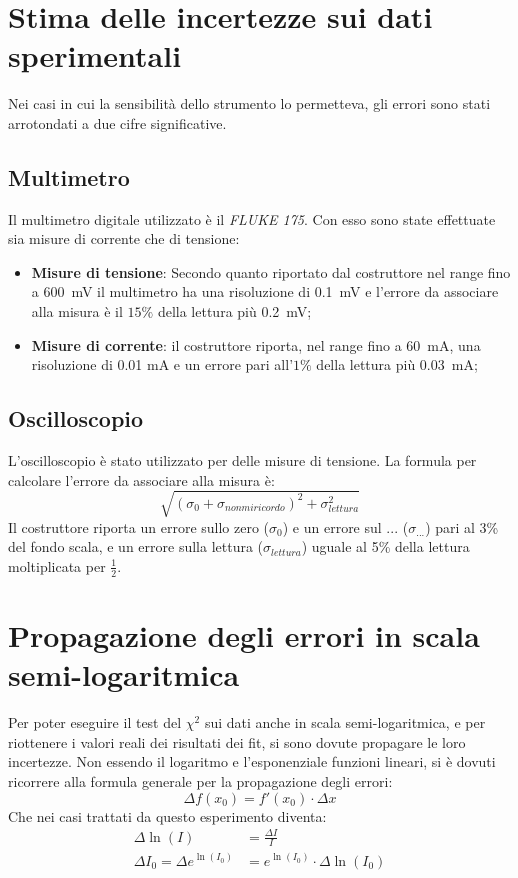 \documentclass[@SRC@/main]{subfiles}
\begin{document}
\section{Stima delle incertezze sui dati sperimentali}
  \label{sec:stima-delle-incertezze-sui-dati-sperimentali}
  Nei casi in cui la sensibilità dello strumento lo permetteva, gli errori sono
  stati arrotondati a due cifre significative.
  \subsection*{Multimetro}
    Il multimetro digitale utilizzato è il \textit{FLUKE 175}.
    Con esso sono state effettuate sia misure di corrente che di tensione:
    \begin{itemize}
      \item \textbf{Misure di tensione}: Secondo quanto riportato dal costruttore nel
      range fino a 600~mV il multimetro ha una risoluzione di 0.1~mV e
      l'errore da associare alla misura è il $15\%$ della lettura più 0.2~mV;
      \item \textbf{Misure di corrente}: il costruttore riporta, nel range fino a
      60~mA, una risoluzione di 0.01 mA e un errore pari all'$1\%$ della
      lettura più 0.03~mA;
    \end{itemize}

  \subsection*{Oscilloscopio}
    L'oscilloscopio è stato utilizzato per delle misure di tensione.
    La formula per calcolare l'errore da associare alla misura è:
    \begin{equation*}
      \sqrt {\left( \sigma_0 + \sigma_{non mi ricordo}  \right)^2 + \sigma_{lettura}^2}
    \end{equation*}
    Il costruttore riporta un errore sullo zero ($\sigma_0$) e un
    errore sul ... ($\sigma_{...}$) pari al 3\% del fondo scala, e un
    errore sulla lettura ($\sigma_{lettura}$) uguale al 5\% della
    lettura moltiplicata per $\frac{1}{2}$.


\section{Propagazione degli errori in scala semi-logaritmica}
  \label{sec:propagazione-errori-log}

  Per poter eseguire il test del $\chi^2$ sui dati anche in scala
  semi-logaritmica, e per riottenere i valori reali dei risultati
  dei fit, si sono dovute propagare le loro incertezze.
  Non essendo il logaritmo e l'esponenziale funzioni lineari, si è
  dovuti ricorrere alla formula generale per la propagazione degli
  errori:
  \begin{equation*}
    \Delta f(x_0) = f'(x_0) \cdot \Delta x
  \end{equation*}
  Che nei casi trattati da questo esperimento diventa:
  \begin{align*}
    \Delta \ln (I) &= \frac{\Delta I}{I} \\
    \Delta I_0 = \Delta e^{\ln (I_0)} &= e^{\ln (I_0)}
    \cdot \Delta \ln (I_0)
  \end{align*}
\end{document}
